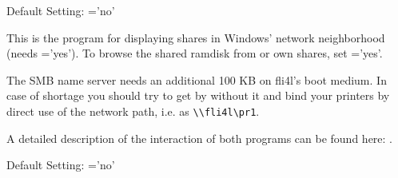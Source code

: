   Default Setting: ='no'


  This is the program for displaying shares in Windows' network
  neighborhood (needs ='yes').
  To browse the shared ramdisk from 
  or own shares, set ='yes'.

  The SMB name server needs an additional 100 KB on fli4l's boot medium. In case
  of shortage you should try to get by without it and bind your printers by
  direct use of the network path, i.e. as \verb+\\fli4l\pr1+.

  A detailed description of the interaction of both programs can be found
  here: .

  Default Setting: ='no'


